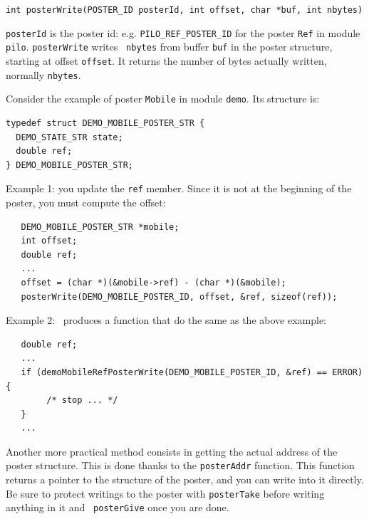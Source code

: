 \bigbreak
{\tt int posterWrite(POSTER\_ID posterId, int offset, char *buf, int nbytes)}
\bigbreak

{\tt posterId} is the poster id: e.g. {\tt PILO\_REF\_POSTER\_ID} for the
poster {\tt Ref} in  module {\tt  pilo}.   {\tt posterWrite} writes  {\tt
nbytes} from buffer {\tt buf} in the poster structure, starting at offset
{\tt offset}.  It returns the  number of bytes actually written, normally
{\tt nbytes}.

\bigbreak

Consider the example  of poster {\tt   Mobile} in module {\tt  demo}. Its
structure is:

\begin{center}\begin{cartouche}\small\begin{verbatim}
typedef struct DEMO_MOBILE_POSTER_STR {
  DEMO_STATE_STR state;
  double ref;
} DEMO_MOBILE_POSTER_STR;
\end{verbatim}\end{cartouche}\end{center}
\label{typedef|demomobile}

Example 1: you update the {\tt ref} member. Since it is not at the
beginning of the poster, you must compute the offset:

\begin{center}\begin{cartouche}\small\begin{verbatim}
   DEMO_MOBILE_POSTER_STR *mobile;
   int offset;
   double ref;
   ...
   offset = (char *)(&mobile->ref) - (char *)(&mobile);
   posterWrite(DEMO_MOBILE_POSTER_ID, offset, &ref, sizeof(ref));
\end{verbatim}\end{cartouche}\end{center}

Example 2:  \GenoM\ produces a  function that  do the  same as  the above
example:

\begin{center}\begin{cartouche}\small\begin{verbatim}
   double ref;
   ...
   if (demoMobileRefPosterWrite(DEMO_MOBILE_POSTER_ID, &ref) == ERROR) {
        /* stop ... */
   }
   ...
\end{verbatim}\end{cartouche}\end{center}

\bigbreak

Another more practical  method consists in getting  the actual address of
the poster   structure.   This is done thanks    to the  {\tt posterAddr}
function. This function returns a pointer to the structure of the poster,
and you can  write into it directly. Be  sure to protect writings to  the
poster with {\tt posterTake} before    writing anything in it and    {\tt
posterGive} once you are done.

